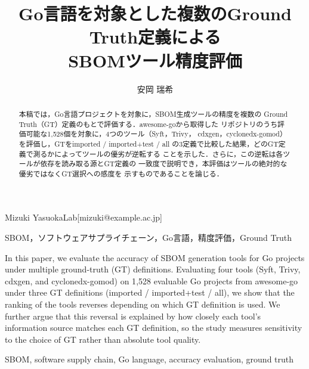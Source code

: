 \documentclass{css}
\begin{document}
\title{Go言語を対象とした複数のGround Truth定義による\\
SBOMツール精度評価}


\author{安岡 瑞希}{Mizuki Yasuoka}{Lab}[mizuki@example.ac.jp]

\begin{abstract}
本稿では，Go言語プロジェクトを対象に，SBOM生成ツールの精度を複数の
Ground Truth（GT）定義のもとで評価する．awesome-goから取得した
リポジトリのうち評価可能な1{,}528個を対象に，4つのツール（Syft，Trivy，
cdxgen，cyclonedx-gomod）を評価し，GTをimported / imported+test / all
の3定義で比較した結果，どのGT定義で測るかによってツールの優劣が逆転する
ことを示した．さらに，この逆転は各ツールが依存を読み取る源とGT定義の
一致度で説明でき，本評価はツールの絶対的な優劣ではなくGT選択への感度を
示すものであることを論じる．
\end{abstract}

\begin{jkeyword}
SBOM，ソフトウェアサプライチェーン，Go言語，精度評価，Ground Truth
\end{jkeyword}

\begin{eabstract}
In this paper, we evaluate the accuracy of SBOM generation tools for
Go projects under multiple ground-truth (GT) definitions. Evaluating
four tools (Syft, Trivy, cdxgen, and cyclonedx-gomod) on 1{,}528
evaluable Go projects from awesome-go under three GT definitions
(imported / imported+test / all), we show that the ranking of the
tools reverses depending on which GT definition is used. We further
argue that this reversal is explained by how closely each tool's
information source matches each GT definition, so the study measures
sensitivity to the choice of GT rather than absolute tool quality.
\end{eabstract}

\begin{ekeyword}
SBOM, software supply chain, Go language, accuracy evaluation, ground truth
\end{ekeyword}

\maketitle
\end{document}
